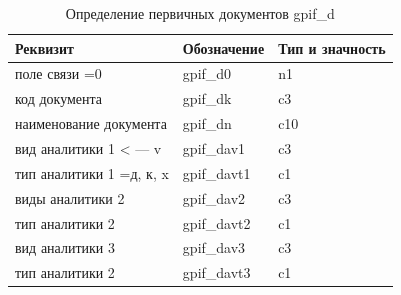 \begin{table}[h!p]
    \centering
    \scriptsize
    \caption{Определение первичных документов gpif\_d}
    \begin{tabular}{|l|l|l|} 

                                                                                   \hline
\textbf{Реквизит}           &\textbf{Обозначение}   &\textbf{Тип и значность}   \\ \hline
поле связи       =0         &gpif\_d0               &n1                         \\ \hline
код документа               &gpif\_dk               &c3                         \\ \hline
наименование документа      &gpif\_dn               &c10                        \\ \hline
вид аналитики 1  < ---  v   &gpif\_dav1             &c3                         \\ \hline
тип аналитики 1    =д, к, x &gpif\_davt1            &c1                         \\ \hline
виды аналитики 2            &gpif\_dav2             &c3                         \\ \hline
тип аналитики 2             &gpif\_davt2            &c1                         \\ \hline
вид аналитики 3             &gpif\_dav3             &c3                         \\ \hline
тип аналитики 2             &gpif\_davt3            &c1                         \\ \hline

    \end{tabular}
\end{table}


